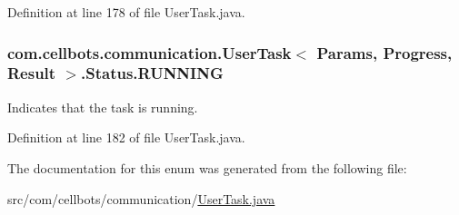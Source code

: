 Definition at line 178 of file User\-Task.\-java.

\hypertarget{enumcom_1_1cellbots_1_1communication_1_1_user_task_3_01_params_00_01_progress_00_01_result_01_4_1_1_status_a95a8249e4f89b48379f521929ef3eea6}{
\subsubsection[{R\-U\-N\-N\-I\-N\-G}]{\setlength{\rightskip}{0pt plus 5cm}com.\-cellbots.\-communication.\-User\-Task$<$ Params, Progress, Result $>$.Status.\-R\-U\-N\-N\-I\-N\-G}}\label{enumcom_1_1cellbots_1_1communication_1_1_user_task_3_01_params_00_01_progress_00_01_result_01_4_1_1_status_a95a8249e4f89b48379f521929ef3eea6}
Indicates that the task is running. 

Definition at line 182 of file User\-Task.\-java.



The documentation for this enum was generated from the following file\-:\begin{DoxyCompactItemize}
\item 
src/com/cellbots/communication/\hyperlink{_user_task_8java}{User\-Task.\-java}\end{DoxyCompactItemize}
